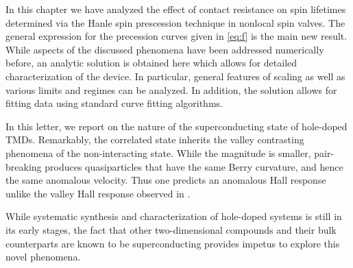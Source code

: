 
In this chapter we have analyzed the effect of contact resistance
on spin lifetimes determined via the Hanle spin prescession technique
in nonlocal spin valves.
The general expression for the precession curves given
in \cref{eq:f} is the main new result.
While aspects of the discussed phenomena have been addressed numerically before,
an analytic solution is obtained here
which allows for detailed characterization of the device.
In particular, general features of scaling
as well as various limits and regimes can be analyzed.
In addition, the solution allows for fitting data
using standard curve fitting algorithms.

In this letter, we report on the nature of the superconducting state
of hole-doped TMDs.
Remarkably, the correlated state inherits
the valley contrasting phenomena of the non-interacting state.
While the magnitude is smaller, pair-breaking produces quasiparticles
that have the same Berry curvature, and hence the same anomalous velocity.
Thus one predicts an anomalous Hall response unlike the valley Hall response
observed in .

While systematic synthesis and characterization of hole-doped systems
is still in its early stages, the fact that other two-dimensional compounds
and their bulk counterparts are known to be superconducting
\cite{%
  PhysRevB.88.054515%
}
provides impetus to explore this novel phenomena.
